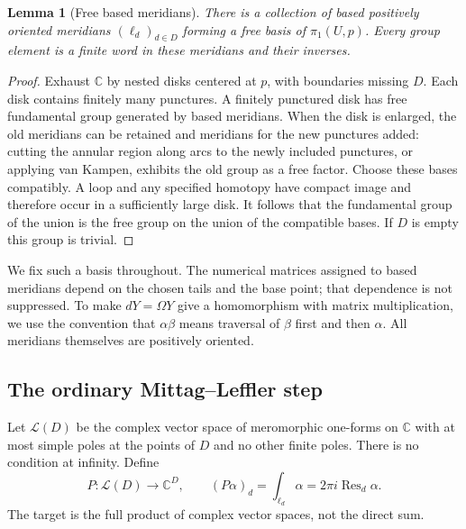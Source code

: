 \documentclass[11pt,letterpaper]{article}
\numberwithin{equation}{section}
\newtheorem{lemma}[theorem]{Lemma}
\theoremstyle{definition}
\theoremstyle{remark}
\newcommand{\C}{\mathbb C}
\newcommand{\LL}{\mathcal L}
\newcommand{\Res}{\operatorname{Res}}
\begin{document}
\begin{lemma}[Free based meridians]\label{lem:free}
There is a collection of based positively oriented meridians
$(\ell_d)_{d\in D}$ forming a free basis of $\pi_1(U,p)$. Every group element
is a finite word in these meridians and their inverses.
\end{lemma}
\begin{proof}
Exhaust $\C$ by nested disks centered at $p$, with boundaries missing $D$.
Each disk contains finitely many punctures. A finitely punctured disk has
free fundamental group generated by based meridians. When the disk is
enlarged, the old meridians can be retained and meridians for the new
punctures added: cutting the annular region along arcs to the newly included
punctures, or applying van Kampen, exhibits the old group as a free factor.
Choose these bases compatibly. A loop and any specified homotopy have compact
image and therefore occur in a sufficiently large disk. It follows that the
fundamental group of the union is the free group on the union of the
compatible bases. If $D$ is empty this group is trivial.
\end{proof}

We fix such a basis throughout. The numerical matrices assigned to based
meridians depend on the chosen tails and the base point; that dependence is
not suppressed. To make $dY=\Omega Y$ give a homomorphism with matrix
multiplication, we use the convention that $\alpha\beta$ means traversal of
$\beta$ first and then $\alpha$. All meridians themselves are positively
oriented.

\subsection{The ordinary Mittag--Leffler step}
Let $\LL(D)$ be the complex vector space of meromorphic one-forms on $\C$
with at most simple poles at the points of $D$ and no other finite poles.
There is no condition at infinity. Define
\begin{equation}\label{eq:period-map}
 P:\LL(D)\longrightarrow\C^D,
 \qquad (P\alpha)_d=\int_{\ell_d}\alpha=2\pi i\Res_d\alpha.
\end{equation}
The target is the full product of complex vector spaces, not the direct sum.
\end{document}
